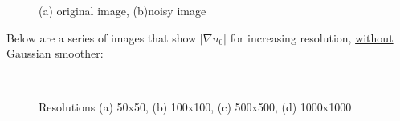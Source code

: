 \documentclass[margin=1in,12pt,3p]{elsarticle}
\begin{document}
\begin{figure}[h!]
  \centering
  \hfill
  \caption{(a) original image, (b)noisy image}
\end{figure}
Below are a series of images that show $|\nabla u_0|$ for increasing resolution, \underline{without} Gaussian smoother:
\begin{figure}[h!]
  \centering
  \hfill
  \\
  \hfill
  \caption{Resolutions (a) 50x50, (b) 100x100, (c) 500x500, (d) 1000x1000}
\end{figure}
\end{document}
